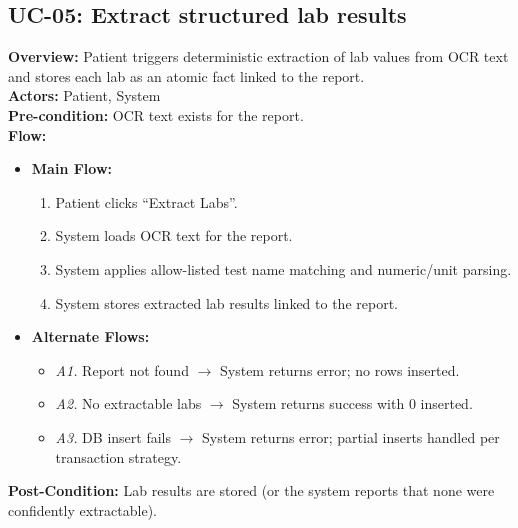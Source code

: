 \documentclass[12pt, a4paper]{article}
\begin{document}
\subsection*{UC-05: Extract structured lab results}
\textbf{Overview:} Patient triggers deterministic extraction of lab values from OCR text and stores each lab as an atomic fact linked to the report. \\
\textbf{Actors:} Patient, System \\
\textbf{Pre-condition:} OCR text exists for the report. \\
\textbf{Flow:}
\begin{itemize}[leftmargin=*]
    \item \textbf{Main Flow:}
    \begin{enumerate}
        \item Patient clicks “Extract Labs”.
        \item System loads OCR text for the report.
        \item System applies allow-listed test name matching and numeric/unit parsing.
        \item System stores extracted lab results linked to the report.
    \end{enumerate}
    \item \textbf{Alternate Flows:}
    \begin{itemize}
        \item \textit{A1.} Report not found $\rightarrow$ System returns error; no rows inserted.
        \item \textit{A2.} No extractable labs $\rightarrow$ System returns success with 0 inserted.
        \item \textit{A3.} DB insert fails $\rightarrow$ System returns error; partial inserts handled per transaction strategy.
    \end{itemize}
\end{itemize}
\textbf{Post-Condition:} Lab results are stored (or the system reports that none were confidently extractable).
\end{document}

